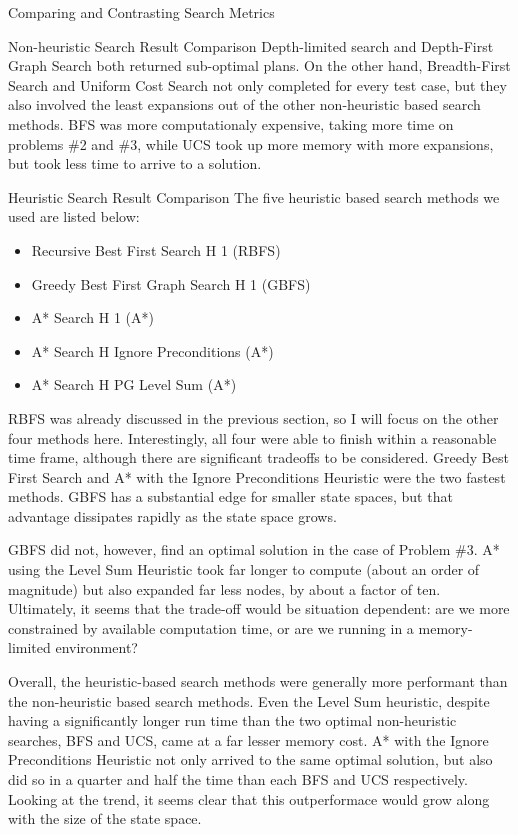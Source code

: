 \documentclass{article}
\begin{document}
\begin{section}{Comparing and Contrasting Search Metrics}
\begin{subsection}{Non-heuristic Search Result Comparison}
	Depth-limited search and Depth-First Graph Search both returned sub-optimal plans. On the other hand, Breadth-First Search and Uniform Cost Search
	not only completed for every test case, but they also involved the least expansions out of the other non-heuristic based search methods. BFS was 
	more computationaly expensive, taking more time on problems \#2 and \#3, while UCS took up more memory with more expansions, but took less time to
	arrive to a solution. 
\end{subsection}
\begin{subsection}{Heuristic Search Result Comparison}
	The five heuristic based search methods we used are listed below:
	\begin{itemize}
		\item Recursive Best First Search H 1 (RBFS)
		\item Greedy Best First Graph Search H 1 (GBFS)
		\item A* Search H 1 (A*)
		\item A* Search H Ignore Preconditions (A*)
		\item A* Search H PG Level Sum (A*)
	\end{itemize}
	RBFS was already discussed in the previous section, so I will focus on the other four methods here. Interestingly, all four were able to finish within 
	a reasonable time frame, although there are significant tradeoffs to be considered. Greedy Best First Search and A* with the Ignore Preconditions Heuristic
	were the two fastest methods. GBFS has a substantial edge for smaller state spaces, but that advantage dissipates rapidly as the state space grows.\par
	GBFS did not, however, find an optimal solution in the case of Problem \#3. A* using the Level Sum Heuristic took far longer to compute (about an order of
	magnitude) but also expanded far less nodes, by about a factor of ten. Ultimately, it seems that the trade-off would be situation dependent: are we more
	constrained by available computation time, or are we running in a memory-limited environment?\par

	Overall, the heuristic-based search methods were generally more performant than the non-heuristic based search methods. Even the Level Sum heuristic,
	despite having a significantly longer run time than the two optimal non-heuristic searches, BFS and UCS, came at a far lesser memory cost. A* with the
	Ignore Preconditions Heuristic not only arrived to the same optimal solution, but also did so in a quarter and half the time than each BFS and UCS 
	respectively. Looking at the trend, it seems clear that this outperformace would grow along with the size of the state space. 
\end{subsection}
\end{section}
\end{document}
